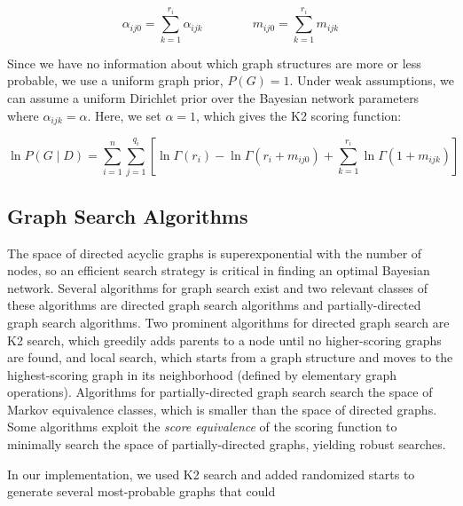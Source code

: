 \documentclass[10pt,letterpaper]{article}
\begin{document}
	$$ \alpha_{ij0} = \sum_{k=1}^{r_i} \alpha_{ijk} \qquad \qquad m_{ij0} = \sum_{k=1}^{r_i} m_{ijk} $$

	Since we have no information about which graph structures are more or less probable, we use a uniform graph prior, $P(G) = 1$. Under weak assumptions, we can assume a uniform Dirichlet prior over the Bayesian network parameters where $\alpha_{ijk} = \alpha$. Here, we set $\alpha = 1$, which gives the K2 scoring function:
	
	$$ \ln P(G \mid D) = \sum_{i=1}^n\sum_{j=1}^{q_i} \left[ \ln \Gamma(r_i) - \ln \Gamma(r_i + m_{ij0}) + \sum_{k=1}^{r_i} \ln \Gamma(1 + m_{ijk})  \right]$$


	\subsection*{\sf \textbf{Graph Search Algorithms}}
	
	The space of directed acyclic graphs is superexponential with the number of nodes, so an efficient search strategy is critical in finding an optimal Bayesian network. Several algorithms for graph search exist and two relevant classes of these algorithms are directed graph search algorithms and partially-directed graph search algorithms. Two prominent algorithms for directed graph search are K2 search, which greedily adds parents to a node until no higher-scoring graphs are found, and local search, which starts from a graph structure and moves to the highest-scoring graph in its neighborhood (defined by elementary graph operations). Algorithms for partially-directed graph search search the space of Markov equivalence classes, which is smaller than the space of directed graphs. Some algorithms exploit the \textit{score equivalence} of the scoring function to minimally search the space of partially-directed graphs, yielding robust searches.
	
	In our implementation, we used K2 search and added randomized starts to generate several most-probable graphs that could 
		
	\newpage
	
\end{document}
